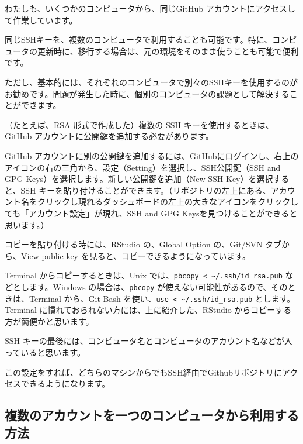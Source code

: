 \documentclass[
  xelatex, ja=standard]{bxjsbook}
\theoremstyle{definition}
\theoremstyle{definition}
\theoremstyle{definition}
\theoremstyle{definition}
\theoremstyle{remark}
\begin{document}
わたしも、いくつかのコンピュータから、同じGitHub アカウントにアクセスして作業しています。

同じSSHキーを、複数のコンピュータで利用することも可能です。特に、コンピュータの更新時に、移行する場合は、元の環境をそのまま使うことも可能で便利です。

ただし、基本的には、それぞれのコンピュータで別々のSSHキーを使用するのがお勧めです。問題が発生した時に、個別のコンピュータの課題として解決することができます。

（たとえば、RSA 形式で作成した）複数の SSH キーを使用するときは、GitHub アカウントに公開鍵を追加する必要があります。

GitHub アカウントに別の公開鍵を追加するには、GitHubにログインし、右上のアイコンの右の三角から、設定（Setting）を選択し、SSH公開鍵（SSH and GPG Keys）を選択します。新しい公開鍵を追加（New SSH Key）を選択すると、SSH キーを貼り付けることができます。（リポジトリの左上にある、アカウント名をクリックし現れるダッシュボードの左上の大きなアイコンをクリックしても「アカウント設定」が現れ、SSH and GPG Keysを見つけることができると思います。）

コピーを貼り付ける時には、RStudio の、Global Option の、Git/SVN タブから、View public key を見ると、コピーできるようになっています。

Terminal からコピーするときは、Unix では、\texttt{pbcopy\ \textless{}\ \textasciitilde{}/.ssh/id\_rsa.pub} などとします。Windows の場合は、\texttt{pbcopy} が使えない可能性があるので、そのときは、Terminal から、Git Bash を使い、\texttt{use\ \textless{}\ \textasciitilde{}/.ssh/id\_rsa.pub} とします。Terminal に慣れておられない方には、上に紹介した、RStudio からコピーする方が簡便かと思います。

SSH キーの最後には、コンピュータ名とコンピュータのアカウント名などが入っていると思います。

この設定をすれば、どちらのマシンからでもSSH経由でGithubリポジトリにアクセスできるようになります。

\hypertarget{ux8907ux6570ux306eux30a2ux30abux30a6ux30f3ux30c8ux3092ux4e00ux3064ux306eux30b3ux30f3ux30d4ux30e5ux30fcux30bfux304bux3089ux5229ux7528ux3059ux308bux65b9ux6cd5}{%
\subsection{複数のアカウントを一つのコンピュータから利用する方法}\label{ux8907ux6570ux306eux30a2ux30abux30a6ux30f3ux30c8ux3092ux4e00ux3064ux306eux30b3ux30f3ux30d4ux30e5ux30fcux30bfux304bux3089ux5229ux7528ux3059ux308bux65b9ux6cd5}}
\end{document}
